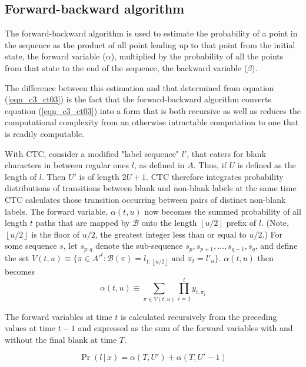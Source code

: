 \subsection{Forward-backward algorithm}

The forward-backward algorithm is used to estimate the probability of a point in the sequence as the product of all point leading up to that point from the  initial state, the forward variable ($\alpha$), multiplied by the probability of all the points from that state to the end of the sequence, the backward variable ($\beta$).

The difference between this estimation and that determined from equation (\ref{eqn_c3_ct03}) is the fact that the forward-backward algorithm converts equation (\ref{eqn_c3_ct03}) into a form that is both recursive as well as reduces the computational complexity from an otherwise intractable computation to one that is readily computable.

With CTC, consider a modified "label sequence" $l'$, that caters for blank characters in between regular ones $l$, as defined in $A$. Thus, if $U$ is defined as the length of $l$.  Then $U'$ is of length $2U + 1$. CTC therefore integrates probability distributions of transitions between blank and non-blank labels at the same time CTC calculates those transition occurring between pairs of distinct non-blank labels.  The forward variable, $\alpha(t,u)$ now becomes the summed probability of all length $t$ paths that are mapped by $\mathcal{B}$ onto the length $\left \lfloor{u/2}\right \rfloor$ prefix of $l$. (Note, $\left \lfloor{u/2}\right \rfloor$ is the floor of $u/2$, the greatest integer less than or equal to $u/2$.) For some sequence $s$, let $s_{p:q}$ denote the sub-sequence $s_p, s_{p+1},\dots,s_{q-1},s_q$, and define the set $V(t,u) \equiv \{ \pi \in A'^t : \mathcal{B}(\pi) = l_{1:\left \lfloor{u/2}\right \rfloor} \text{ and } \pi_t = l'_u \}$.  $\alpha(t,u)$ then becomes
\begin{equation}
\alpha(t,u) \equiv \sum_{\pi \in V(t,u)} \prod_{i=1}^{t} y_{i,\pi_i} 
\label{eqn_c3_ctc04}
\end{equation}

The forward variables at time $t$ is calculated recursively from the preceding values at time $t - 1$ and expressed as the sum of the forward variables with and without the final blank at time $T$.

\begin{equation}
\Pr( l \, | \, x) = \alpha(T, U') + \alpha(T, U' - 1)
\label{eqn_c3_ctc05}
\end{equation}

